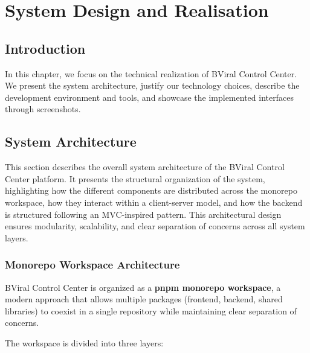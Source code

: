 \chapter{System Design and Realisation}


\section*{Introduction}
In this chapter, we focus on the technical realization of BViral Control Center. We present the system architecture, justify our technology choices, describe the development environment and tools, and showcase the implemented interfaces through screenshots.

\section{System Architecture}
This section describes the overall system architecture of the BViral Control Center platform. It presents the structural organization of the system, highlighting how the different components are distributed across the monorepo workspace, how they interact within a client-server model, and how the backend is structured following an MVC-inspired pattern. This architectural design ensures modularity, scalability, and clear separation of concerns across all system layers.
\subsection{Monorepo Workspace Architecture}

BViral Control Center is organized as a \textbf{pnpm monorepo workspace}, a modern approach that allows multiple packages (frontend, backend, shared libraries) to coexist in a single repository while maintaining clear separation of concerns.


The workspace is divided into three layers:


